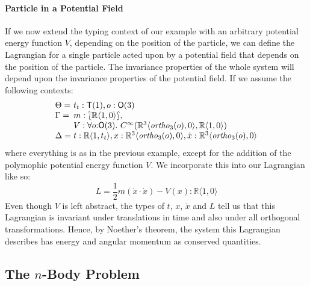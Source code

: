 \documentclass{sigplanconf}
\newcommand{\typeOfCartSp}[1]{\lbag #1 \rbag}
\theoremstyle{examplestyle}
\begin{document}
\paragraph{Particle in a Potential Field}

If we now extend the typing context of our example with an arbitrary
potential energy function $V$, depending on the position of the
particle, we can define the Lagrangian for a single particle acted
upon by a potential field that depends on the position of the
particle. The invariance properties of the whole system will depend
upon the invariance properties of the potential field. If we assume
the following contexts:
\begin{displaymath}
  \begin{array}{l@{\hspace{0.3em}}l}
    \Theta = & t_t : \mathsf{T}(1), o : \mathsf{O}(3) \\
    \Gamma = &
    \begin{array}[t]{@{}l}
      m : \typeOfCartSp{\mathbb{R}\langle 1, 0 \rangle}, \\
      V : \forall o \mathord: \mathsf{O}(3).~C^\infty(\mathbb{R}^3\langle \mathit{ortho}_3(o), 0 \rangle, \mathbb{R}\langle 1, 0 \rangle)
    \end{array}\\
    \Delta = & t : \mathbb{R}\langle 1, t_t \rangle, x : \mathbb{R}^3\langle \mathit{ortho}_3(o), 0 \rangle, \dot{x} : \mathbb{R}^3\langle \mathit{ortho}_3(o), 0 \rangle
  \end{array}
\end{displaymath}
where everything is as in the previous example, except for the
addition of the polymophic potential energy function $V$. We
incorporate this into our Lagrangian like so:
\begin{displaymath}
  L = \frac{1}{2}m(\dot{x} \cdot \dot{x}) - V(x) : \mathbb{R}\langle 1, 0 \rangle
\end{displaymath}
Even though $V$ is left abstract, the types of $t$, $x$, $\dot{x}$ and
$L$ tell us that this Lagrangian is invariant under translations in
time and also under all orthogonal transformations. Hence, by
Noether's theorem, the system this Lagrangian describes has energy and
angular momentum as conserved quantities.

\subsection{The $n$-Body Problem}
\end{document}
